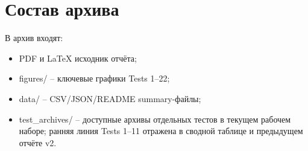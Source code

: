 \documentclass[12pt,a4paper]{article}
\begin{document}
\appendix
\section{Состав архива}

В архив входят:
\begin{itemize}
\item PDF и LaTeX исходник отчёта;
\item figures/ -- ключевые графики Tests 1--22;
\item data/ -- CSV/JSON/README summary-файлы;
\item test\_archives/ -- доступные архивы отдельных тестов в текущем рабочем наборе; ранняя линия Tests 1--11 отражена в сводной таблице и предыдущем отчёте v2.
\end{itemize}
\end{document}
